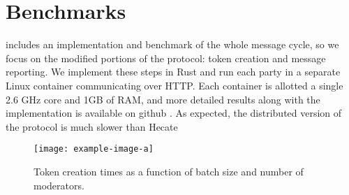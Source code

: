 \documentclass[conference]{IEEEtran}
\begin{document}
\section{Benchmarks}

\textcite{hecate} includes an implementation and benchmark of the whole message cycle, so we focus on the modified portions of the protocol: token creation and message reporting.
We implement these steps in Rust and run each party in a separate Linux container communicating over HTTP. Each container is allotted a single 2.6 GHz core and 1GB of RAM, and more detailed results along with the implementation is available on github \cite{cerberus-github}. As expected, the distributed version of the protocol is much slower than Hecate

\begin{figure}[tb]
	\centering
	\texttt{[image: example-image-a]}
	\caption{Token creation times as a function of batch size and number of moderators.}
	\label{fig:token-creation-benchmark}
\end{figure}


\printbibliography
\end{document}
